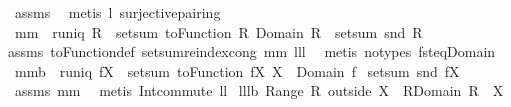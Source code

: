 \begin{isabellebody}
%
\isadelimproof
%
\endisadelimproof
%
\isatagproof
{}\isamarkupfalse%
\ assms\ \isamarkupfalse%
\ {\isacharparenleft}metis\ l{}{}\ surjective{\isacharunderscore}pairing{\isacharparenright}%
\endisatagproof
{\isafoldproof}%
%
\isadelimproof
\isanewline
%
\endisadelimproof
\isanewline
{}\isamarkupfalse%
\ mm{}{}{\isacharcolon}\ \ {\isachardoublequoteopen}runiq\ R{\isachardoublequoteclose}\ \ {\isachardoublequoteopen}setsum\ {\isacharparenleft}toFunction\ R{\isacharparenright}\ {\isacharparenleft}Domain\ R{\isacharparenright}\ {\isacharequal}\ setsum\ snd\ R{\isachardoublequoteclose}%
\isadelimproof
\ %
\endisadelimproof
%
\isatagproof
{}\isamarkupfalse%
\ \isanewline
assms\ toFunction{\isacharunderscore}def\ setsum{\isachardot}reindex{\isacharunderscore}cong\ mm{}{}\ lll{}{}\ \isamarkupfalse%
\ {\isacharparenleft}metis\ {\isacharparenleft}no{\isacharunderscore}types{\isacharparenright}\ fst{\isacharunderscore}eq{\isacharunderscore}Domain{\isacharparenright}%
\endisatagproof
{\isafoldproof}%
%
\isadelimproof
%
\endisadelimproof
\isanewline
\isanewline
{}\isamarkupfalse%
\ mm{}{}b{\isacharcolon}\ \ {\isachardoublequoteopen}runiq\ {\isacharparenleft}f{\isacharbar}{\isacharbar}X{\isacharparenright}{\isachardoublequoteclose}\ \ {\isachardoublequoteopen}setsum\ {\isacharparenleft}toFunction\ {\isacharparenleft}f{\isacharbar}{\isacharbar}X{\isacharparenright}{\isacharparenright}\ {\isacharparenleft}X\ {\isasyminter}\ Domain\ f{\isacharparenright}\ {\isacharequal}\isanewline
setsum\ snd\ {\isacharparenleft}f{\isacharbar}{\isacharbar}X{\isacharparenright}{\isachardoublequoteclose}%
\isadelimproof
\ %
\endisadelimproof
%
\isatagproof
{}\isamarkupfalse%
\ assms\ mm{}{}\ \isamarkupfalse%
\ {\isacharparenleft}metis\ Int{\isacharunderscore}commute\ ll{}{}{\isacharparenright}%
\endisatagproof
{\isafoldproof}%
%
\isadelimproof
%
\endisadelimproof
\isanewline
\isanewline
{}\isamarkupfalse%
\ lll{}{}b{\isacharcolon}\ {\isachardoublequoteopen}Range\ {\isacharparenleft}R\ outside\ X{\isacharparenright}\ {\isacharequal}\ R{\isacharbackquote}{\isacharbackquote}{\isacharparenleft}Domain\ R\ {\isacharminus}\ X{\isacharparenright}{\isachardoublequoteclose}\ \isanewline
%
\isadelimproof

\end{isabellebody}
